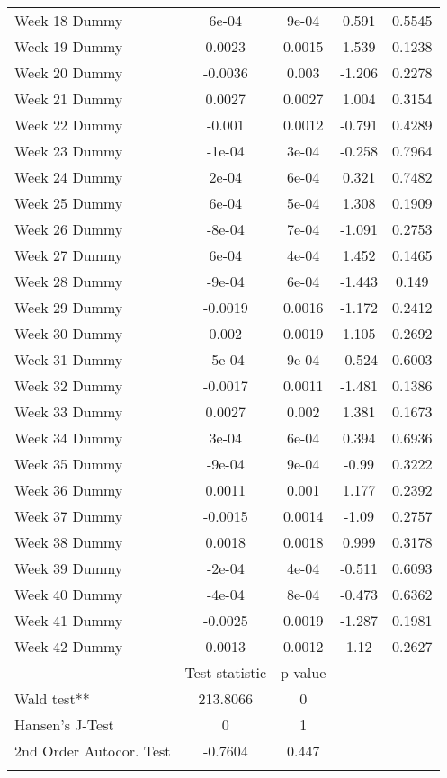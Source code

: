 \begin{longtable}{lcccc}
  Week 18 Dummy & 6e-04 & 9e-04 & 0.591 & 0.5545 \\ 
  Week 19 Dummy & 0.0023 & 0.0015 & 1.539 & 0.1238 \\ 
  Week 20 Dummy & -0.0036 & 0.003 & -1.206 & 0.2278 \\ 
  Week 21 Dummy & 0.0027 & 0.0027 & 1.004 & 0.3154 \\ 
  Week 22 Dummy & -0.001 & 0.0012 & -0.791 & 0.4289 \\ 
  Week 23 Dummy & -1e-04 & 3e-04 & -0.258 & 0.7964 \\ 
  Week 24 Dummy & 2e-04 & 6e-04 & 0.321 & 0.7482 \\ 
  Week 25 Dummy & 6e-04 & 5e-04 & 1.308 & 0.1909 \\ 
  Week 26 Dummy & -8e-04 & 7e-04 & -1.091 & 0.2753 \\ 
  Week 27 Dummy & 6e-04 & 4e-04 & 1.452 & 0.1465 \\ 
  Week 28 Dummy & -9e-04 & 6e-04 & -1.443 & 0.149 \\ 
  Week 29 Dummy & -0.0019 & 0.0016 & -1.172 & 0.2412 \\ 
  Week 30 Dummy & 0.002 & 0.0019 & 1.105 & 0.2692 \\ 
  Week 31 Dummy & -5e-04 & 9e-04 & -0.524 & 0.6003 \\ 
  Week 32 Dummy & -0.0017 & 0.0011 & -1.481 & 0.1386 \\ 
  Week 33 Dummy & 0.0027 & 0.002 & 1.381 & 0.1673 \\ 
  Week 34 Dummy & 3e-04 & 6e-04 & 0.394 & 0.6936 \\ 
  Week 35 Dummy & -9e-04 & 9e-04 & -0.99 & 0.3222 \\ 
  Week 36 Dummy & 0.0011 & 0.001 & 1.177 & 0.2392 \\ 
  Week 37 Dummy & -0.0015 & 0.0014 & -1.09 & 0.2757 \\ 
  Week 38 Dummy & 0.0018 & 0.0018 & 0.999 & 0.3178 \\ 
  Week 39 Dummy & -2e-04 & 4e-04 & -0.511 & 0.6093 \\ 
  Week 40 Dummy & -4e-04 & 8e-04 & -0.473 & 0.6362 \\ 
  Week 41 Dummy & -0.0025 & 0.0019 & -1.287 & 0.1981 \\ 
  Week 42 Dummy & 0.0013 & 0.0012 & 1.12 & 0.2627 \\ 
   & Test statistic & p-value &  &  \\ 
  Wald test** & 213.8066 & 0 &  &  \\ 
  Hansen's J-Test & 0 & 1 &  &  \\ 
  2nd Order Autocor. Test & -0.7604 & 0.447 &  &  \\ 
   \bottomrule
\caption{Results of two-step GMM estimation of policy, behavior and information on %
\label{tab_results:cases_spec_3_full}
\end{longtable}
\endgroup
